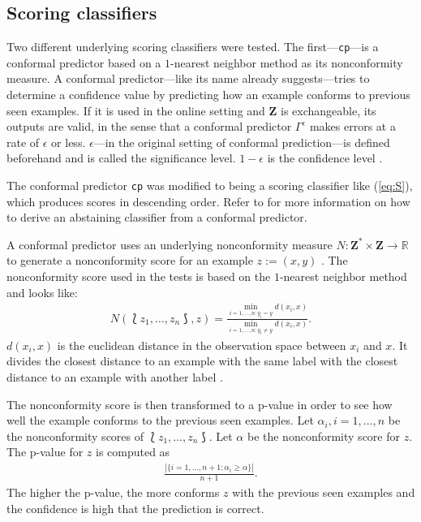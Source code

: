 \documentclass[twoside,11pt]{article}
\def\ds{\Lbag z_1,\dots,z_n \Rbag}
\def\Z{\textbf{Z}}
\begin{document}
\subsection{Scoring classifiers}

Two different underlying scoring classifiers were tested.
The first---\texttt{cp}---is a conformal predictor based
on a $1$-nearest neighbor method as its nonconformity
measure.
A conformal predictor---like its name already
suggests---tries to determine a confidence value by
predicting how an example conforms to previous seen
examples.
If it is used in the online setting and $\Z$ is
exchangeable, its outputs are valid, in the sense that a
conformal predictor $\Gamma^{\epsilon}$ makes errors at
a rate of $\epsilon$ or less.
$\epsilon$---in the original setting of conformal
prediction---is defined beforehand and is called the
significance level. $1-\epsilon$ is the confidence level
\citep[see][]{alrw, fassbender_2019}.

The conformal predictor \texttt{cp} was modified to being a
scoring classifier like (\ref{eq:S}), which produces scores
in descending order.
Refer to \citet{fassbender_2019} for more information on
how to derive an abstaining classifier from  a conformal
predictor.

A conformal predictor uses an underlying nonconformity
measure $N:\Z^* \times \Z \rightarrow \mathbb{R}$ to
generate a nonconformity score for an example $z := (x,y)$
\citep[see][]{alrw, fassbender_2019}.
The nonconformity score used in the tests is based on
the $1$-nearest neighbor method and looks like:
\begin{align*}
  N(\ds, z) = \frac{\min_{i=1,\dots,n:y_i=y}d(x_i, x)}
                   {\min_{i=1,\dots,n:y_i\neq y}d(x_i,x)}.
\end{align*}
$d(x_i, x)$ is the euclidean distance in the observation
space between $x_i$ and $x$. It divides the closest
distance to an example with the same label with the
closest distance to an example with another label
\citep[see][]{alrw, fassbender_2019}.

The nonconformity score is then transformed to a p-value
in order to see how well the example conforms to the
previous seen examples. Let $\alpha_i, i=1,\dots,n$ be the
nonconformity scores of $\ds$. Let $\alpha$ be the
nonconformity score for $z$. The p-value for $z$ is
computed as
\begin{align*}
  \frac{|\{i=1,\dots,n+1: \alpha_i \geq \alpha\}|}{n + 1}.
\end{align*}
The higher the p-value, the more conforms $z$ with the
previous seen examples and the confidence is high that the
prediction is correct.
\end{document}
